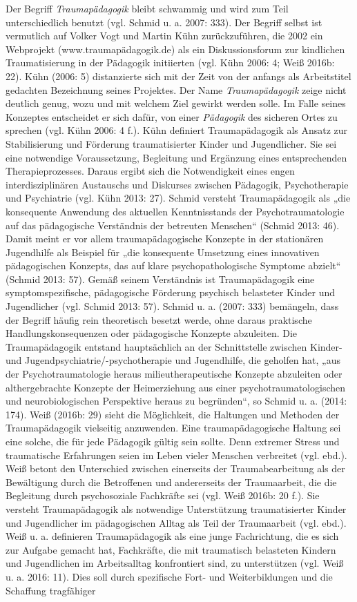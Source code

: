 Der Begriff \textit{Traumapädagogik} bleibt schwammig und wird zum Teil unterschiedlich benutzt (vgl. Schmid u. a. 2007: 333). Der Begriff selbst ist vermutlich auf Volker Vogt und Martin Kühn zurückzuführen, die 2002 ein Webprojekt (www.traumapädagogik.de) als ein Diskussionsforum zur kindlichen Traumatisierung in der Pädagogik initiierten (vgl. Kühn 2006: 4; Weiß 2016b: 22). Kühn (2006: 5) distanzierte sich mit der Zeit von der anfangs als Arbeitstitel gedachten Bezeichnung seines Projektes. Der Name \textit{Traumapädagogik} zeige nicht deutlich genug, wozu und mit welchem Ziel gewirkt werden solle. Im Falle seines Konzeptes entscheidet er sich dafür, von einer \textit{Pädagogik} des sicheren Ortes zu sprechen (vgl. Kühn 2006: 4 f.). Kühn definiert Traumapädagogik als Ansatz zur Stabilisierung und Förderung traumatisierter Kinder und Jugendlicher. Sie sei eine notwendige Voraussetzung, Begleitung und Ergänzung eines entsprechenden Therapieprozesses. Daraus ergibt sich die Notwendigkeit eines engen interdisziplinären Austauschs und Diskurses zwischen Pädagogik, Psychotherapie und Psychiatrie (vgl. Kühn 2013: 27). Schmid versteht Traumapädagogik als „die konsequente Anwendung des aktuellen Kenntnisstands der Psychotraumatologie auf das pädagogische Verständnis der betreuten Menschen“ (Schmid 2013: 46). Damit meint er vor allem traumapädagogische Konzepte in der stationären Jugendhilfe als Beispiel für „die konsequente Umsetzung eines innovativen pädagogischen Konzepts, das auf klare psychopathologische Symptome abzielt“ (Schmid 2013: 57). Gemäß seinem Verständnis ist Traumapädagogik eine symptomspezifische, pädagogische Förderung psychisch belasteter Kinder und Jugendlicher (vgl. Schmid 2013: 57). Schmid u. a. (2007: 333) bemängeln, dass der Begriff häufig rein theoretisch besetzt werde, ohne daraus praktische Handlungskonsequenzen oder pädagogische Konzepte abzuleiten. Die Traumapädagogik entstand hauptsächlich an der Schnittstelle zwischen Kinder- und Jugendpsychiatrie/-psychotherapie und Jugendhilfe, die geholfen hat, „aus der Psychotraumatologie heraus milieutherapeutische Konzepte abzuleiten oder althergebrachte Konzepte der Heimerziehung aus einer psychotraumatologischen und neurobiologischen Perspektive heraus zu begründen“, so Schmid u. a. (2014: 174). Weiß (2016b: 29) sieht die Möglichkeit, die Haltungen und Methoden der Traumapädagogik vielseitig anzuwenden. Eine traumapädagogische Haltung sei eine solche, die für jede Pädagogik gültig sein sollte. Denn extremer Stress und traumatische Erfahrungen seien im Leben vieler Menschen verbreitet (vgl. ebd.). Weiß betont den Unterschied zwischen einerseits der Traumabearbeitung als der Bewältigung durch die Betroffenen und andererseits der Traumaarbeit, die die Begleitung durch psychosoziale Fachkräfte sei (vgl. Weiß 2016b: 20 f.). Sie versteht Traumapädagogik als notwendige Unterstützung traumatisierter Kinder und Jugendlicher im pädagogischen Alltag als Teil der Traumaarbeit (vgl. ebd.). Weiß u. a. definieren Traumapädagogik als eine junge Fachrichtung, die es sich zur Aufgabe gemacht hat, Fachkräfte, die mit traumatisch belasteten Kindern und Jugendlichen im Arbeitsalltag konfrontiert sind, zu unterstützen (vgl. Weiß u. a. 2016: 11). Dies soll durch spezifische Fort- und Weiterbildungen und die Schaffung tragfähiger 